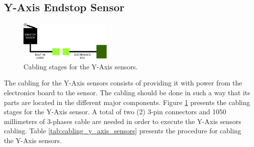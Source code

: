 \documentclass{article}
\begin{document}
\subsection{Y-Axis Endstop Sensor}
\begin{figure}[H]
    \centering
    \includegraphics[width=0.4\textwidth]{images/cabling/y_axis_sensors_cabling.pdf}
    \caption{Cabling stages for the Y-Axis sensors.}
    \label{fig:cabling_y_axis_sensors}
\end{figure}
The cabling for the Y-Axis sensors consists of providing it with power from the electronics board to the sensor. The cabling should be done in such a way that its parts are located in the different major components. Figure \ref{fig:cabling_y_axis_sensors} presents the cabling stages for the Y-Axis sensor. A total of two (2) 3-pin connectors and 1050 millimeters of 3-phases cable are needed in order to execute the Y-Axis sensors cabling. Table \ref{tab:cabling_y_axis_sensors} presents the procedure for cabling the Y-Axis sensors.
\end{document}
